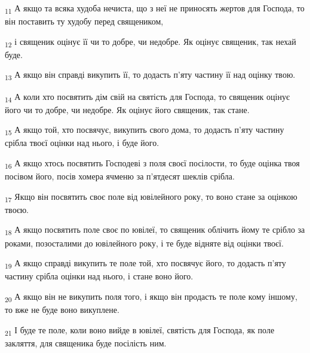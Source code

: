 \begin{tcolorbox}
\textsubscript{11} А якщо та всяка худоба нечиста, що з неї не приносять жертов для Господа, то він поставить ту худобу перед священиком,
\end{tcolorbox}
\begin{tcolorbox}
\textsubscript{12} і священик оцінує її чи то добре, чи недобре. Як оцінує священик, так нехай буде.
\end{tcolorbox}
\begin{tcolorbox}
\textsubscript{13} А якщо він справді викупить її, то додасть п'яту частину її над оцінку твою.
\end{tcolorbox}
\begin{tcolorbox}
\textsubscript{14} А коли хто посвятить дім свій на святість для Господа, то священик оцінує його чи то добре, чи недобре. Як оцінує його священик, так стане.
\end{tcolorbox}
\begin{tcolorbox}
\textsubscript{15} А якщо той, хто посвячує, викупить свого дома, то додасть п'яту частину срібла твоєї оцінки над нього, і буде його.
\end{tcolorbox}
\begin{tcolorbox}
\textsubscript{16} А якщо хтось посвятить Господеві з поля своєї посілости, то буде оцінка твоя посівом його, посів хомера ячменю за п'ятдесят шеклів срібла.
\end{tcolorbox}
\begin{tcolorbox}
\textsubscript{17} Якщо він посвятить своє поле від ювілейного року, то воно стане за оцінкою твоєю.
\end{tcolorbox}
\begin{tcolorbox}
\textsubscript{18} А якщо посвятить поле своє по ювілеї, то священик облічить йому те срібло за роками, позосталими до ювілейного року, і те буде відняте від оцінки твоєї.
\end{tcolorbox}
\begin{tcolorbox}
\textsubscript{19} А якщо справді викупить те поле той, хто посвячує його, то додасть п'яту частину срібла оцінки над нього, і стане воно його.
\end{tcolorbox}
\begin{tcolorbox}
\textsubscript{20} А якщо він не викупить поля того, і якщо він продасть те поле кому іншому, то вже не буде воно викуплене.
\end{tcolorbox}
\begin{tcolorbox}
\textsubscript{21} І буде те поле, коли воно вийде в ювілеї, святість для Господа, як поле закляття, для священика буде посілість ним.
\end{tcolorbox}

